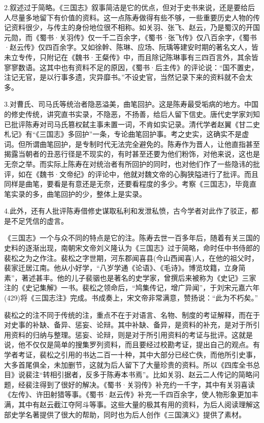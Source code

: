 \documentclass[12pt,UTF8]{ctexbook}
\begin{document}
2.叙述过于简略。《三国志》叙事简洁是它的优点，但对于史书来说，还是要给后人尽量多地留下有价值的资料。这一点陈寿做得有些不够，一些重要历史人物的传记资料很少，与传主的身份地位很不相称。如关羽、张飞、赵云，乃是蜀汉的开国元勋，而《蜀书·关羽传》仅一千二百余字，《蜀书·张飞传》仅八百余字，《蜀书·赵云传》仅四百余字。又如徐幹、陈琳、应场、阮瑀等建安时期的著名文人，皆未立专传，只附记在《魏书·王粲传》中，而且除记陈琳事有三四百言外，其余皆寥寥数语。这其中也有资料不足的原因，《蜀书·后主传》的评论说：“国不置史，注记无官，是以行事多遗，灾异靡书。”不设史官，当然记录下来的资料就不会太多。

3.对曹氏、司马氏等统治者隐恶溢美，曲笔回护。这是陈寿最受垢病的地方。中国的修史传统，讲究直书实录，不隐恶，不扬善，给后人留下信史。唐代史学家刘知已批评陈寿对司马氏篡权弑主事未置一词，不肯如实记录。清代学者赵翼《甘二史札记》有“《三国志》多回护”一条，专论曲笔回护事。考之史实，这确实不是虚词。但所谓曲笔回护，是专制时代无法完全避免的。陈寿作为晋人，让他直指甚至揭露当朝者的丑恶行径是不现实的，有时甚至还要为他们粉饰，对他来说，这也是无奈之举。而实际上陈寿在对统治者有所回护的同时，也对他们作了一些隐讳的批评，如在《魏书·文帝纪》的评论中，他就对魏文帝的心胸狭隘进行了批评。而且同样是曲笔，要看是有意还是无奈，还要看程度的多少。考察《三国志》，毕竟直笔实录的多，曲笔回护的少，整体上是实录。

4.此外，还有人批评陈寿借修史谋取私利和发泄私愤，古今学者对此作了驳正，都是不足凭信的虚言。

《三国志》一个与众不同的特点是它的注。陈寿去世一百多年后，随着有关三国的史料的逐渐出现，南朝宋文帝刘义隆认为《三国志》过于简略，命时任中书侍郎的裴松之为之作注。裴松之字世期，河东郡闻喜县(今山西闻喜)人，在他的祖父时，裴家迁居江南。他从小好学，“八岁学通《论语》、《毛诗》。博览坟籍，立身简素”，著述甚丰。他的儿子裴骃也是著名的史学家，曾撰后来被称为《史记》三家注的《史记集解》一书。裴松之领命后，“鸠集传记，增广异闻”，于刘宋元嘉六年(429)将《三国志注》完成。书成奏上，宋文帝非常满意，赞扬说：“此为不朽矣。”

裴松之的注不同于传统的注，重点不在于对语言、名物、制度的考证解释，而在于对史事的补缺、备异、惩妄、论辩。其中补缺、备异，是资料的补充，是对于所引用资料的归纳与整理。惩妄、论辩，则是对于所引用资料的考证与批评。这就是说，他不仅仅是简单的搜集罗列资料，而且要经过校勘考证，提出自己的观点。有学者考证，裴松之引用的书达二百一十种，其中大部分已经亡佚，而他所引史事，大多首尾俱全，未加删节，这就为后人留下了大量珍贵的资料。所以《四库全书总目》说裴注“转相引据者，反多于陈寿本书焉”。比如关羽、赵云二人传记的简略问题，经裴注得到了很好的解决。《蜀书·关羽传》补充约一千字，其中有关羽喜读《左传》、许田射猎等事。《蜀书·赵云传》补充一千四百余字，使人物形象更加丰满，其中有赵云截江夺阿斗等事。这些大量的极其有用的资料，为后人阅读理解这部史学名著提供了很大的帮助，同时也为后人创作《三国演义》提供了素材。
\end{document}
